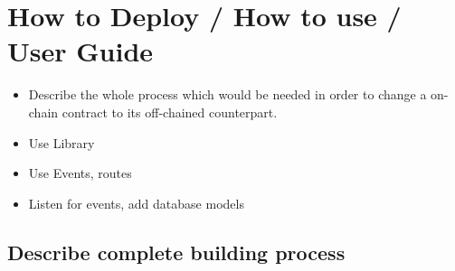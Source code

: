 \section{How to Deploy / How to use / User Guide}



\begin{itemize}
\item Describe the whole process which would be needed in order to change a on-chain contract to its off-chained counterpart.
\item Use Library
\item Use Events, routes
\item Listen for events, add database models
\end{itemize}

\subsection{Describe complete building process}


\newpage
